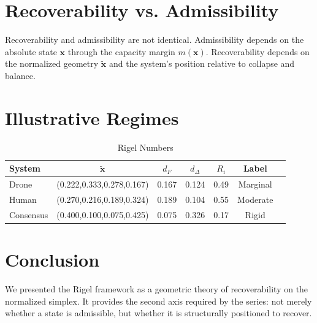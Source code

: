 \documentclass[letterpaper,10pt,conference]{ieeeconf}
\newcommand{\x}{\mathbf{x}}
\newcommand{\xt}{\tilde{\mathbf{x}}}
\newcommand{\Ri}{R_i}
\begin{document}
\section{Recoverability vs. Admissibility}
Recoverability and admissibility are not identical. Admissibility depends on the absolute state $\x$ through the capacity margin $m(\x)$. Recoverability depends on the normalized geometry $\xt$ and the system's position relative to collapse and balance.
\section{Illustrative Regimes}
\begin{table}[h]
\centering
\caption{Rigel Numbers}
\begin{tabular}{lcccccc}
\hline
System & $\xt$ & $d_F$ & $d_\Delta$ & $\Ri$ & Label \\
\hline
Drone & (0.222,0.333,0.278,0.167) & 0.167 & 0.124 & 0.49 & Marginal \\
Human & (0.270,0.216,0.189,0.324) & 0.189 & 0.104 & 0.55 & Moderate \\
Consensus & (0.400,0.100,0.075,0.425) & 0.075 & 0.326 & 0.17 & Rigid \\
\hline
\end{tabular}
\end{table}
\section{Conclusion}
We presented the Rigel framework as a geometric theory of recoverability on the normalized simplex. It provides the second axis required by the series: not merely whether a state is admissible, but whether it is structurally positioned to recover.
\end{document}
